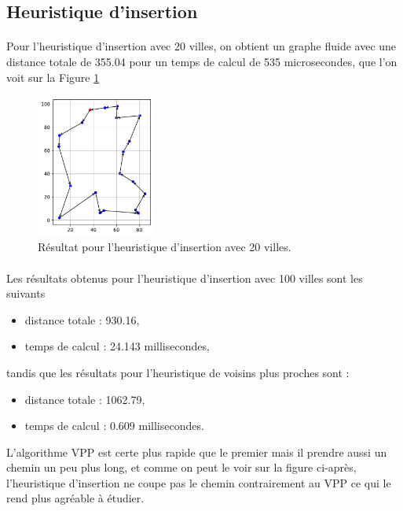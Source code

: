 \documentclass[a4paper,11pt,fleqn]{article}
\begin{document}
\subsection*{Heuristique d'insertion}
\paragraph{}
Pour l'heuristique d'insertion avec 20 villes, on obtient un graphe fluide avec une distance totale de 355.04 pour un temps de calcul de 535 microsecondes, que l'on voit sur la Figure \ref{fig:insert-20}
\begin{figure}[H]
    \centering
    \includegraphics[width=0.35\textwidth]{images/insertion_20_villes.pdf}
    \caption{Résultat pour l'heuristique d'insertion avec 20 villes.}
    \label{fig:insert-20}
\end{figure}
\paragraph{}

Les résultats obtenus pour l'heuristique d'insertion avec 100 villes sont les suivants 

\begin{itemize}[noitemsep,topsep=5pt]
    \item distance totale : 930.16,
    \item temps de calcul : 24.143 millisecondes,
\end{itemize}

tandis que les résultats pour l'heuristique de voisins plus proches sont :

\begin{itemize}[noitemsep,topsep=5pt]
    \item distance totale : 1062.79,
    \item temps de calcul : 0.609 millisecondes.
\end{itemize}

L'algorithme VPP est certe plus rapide que le premier mais il prendre aussi un chemin un peu plus long, et comme on peut le voir sur la figure ci-après, l'heuristique d'insertion ne coupe pas le chemin contrairement au VPP ce qui le rend plus agréable à étudier. 
\end{document}
